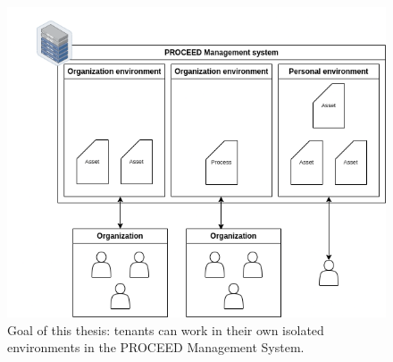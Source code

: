 \begin{figure}[H]
    \centering
    \includegraphics[scale=0.45]{images/proceed-workspaces-v2.drawio.png}
    \caption{Goal of this thesis: tenants can work in their own isolated environments in
    the PROCEED Management System.}
    \label{fig:proceed-envitonments-overview}
\end{figure}


%
%

